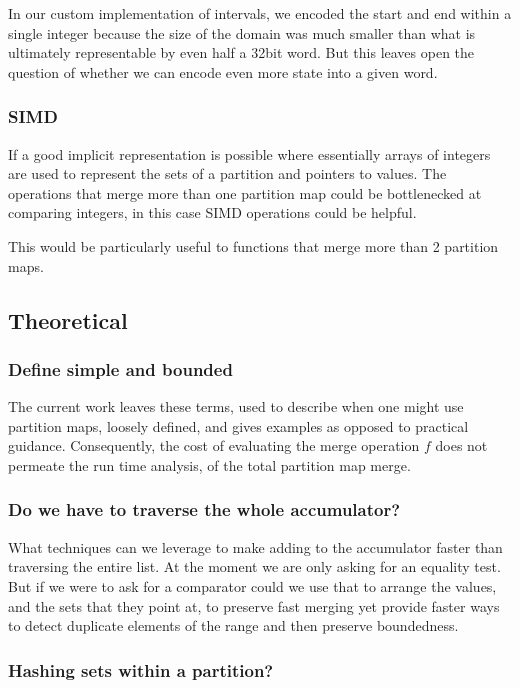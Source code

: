 \documentclass{article}
\begin{document}
In our custom implementation of intervals, we encoded the start and end
within a single integer because the size of the domain was much smaller
than what is ultimately representable by even half a 32bit word.
But this leaves open the question of whether we can encode even more state
into a given word.

\subsubsection{SIMD}

If a good implicit representation is possible where essentially arrays of
integers are used to represent the sets of a partition and pointers to values.
The operations that merge more than one partition map could be bottlenecked
at comparing integers,
in this case SIMD operations could be helpful.

This would be particularly useful to functions that merge more than 2
partition maps.

\subsection{Theoretical}

\subsubsection{Define simple and bounded}

The current work leaves these terms,
used to describe when one might use partition maps,
loosely defined,
and gives examples as opposed to practical guidance.
Consequently,
the cost of evaluating the merge operation $f$ does not permeate
the run time analysis,
of the total partition map merge.

\subsubsection{Do we have to traverse the whole accumulator?}

What techniques can we leverage to make adding to the accumulator
faster than traversing the entire list.
At the moment we are only asking for an equality test.
But if we were to ask for a comparator could we use that to arrange the values,
and the sets that they point at,
to preserve fast merging yet provide faster ways to detect duplicate elements
of the range and then preserve boundedness.

\subsubsection{Hashing sets within a partition?}
\end{document}
